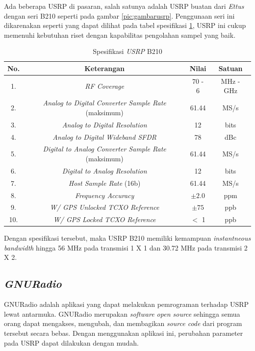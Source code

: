 Ada beberapa USRP di pasaran, salah satunya adalah USRP buatan dari \textit{Ettus} dengan seri B210 seperti pada gambar \ref{pic:gambarusrp}. Penggunaan seri ini dikarenakan seperti yang dapat dilihat pada tabel spesifikasi \ref{tab:spekb210}, USRP ini cukup memenuhi kebutuhan riset dengan kapabilitas pengolahan sampel yang baik.

\begin{longtable}{|c|c|c|c|}
	\caption{Spesifikasi \textit{USRP} B210}
	\label{tab:spekb210}\\
	\hline
	No. & Keterangan & Nilai & Satuan \\
	\hline
	1. & \textit{RF Coverage} & 70 - 6 & MHz - GHz \\
	\hline
	2. & \textit{Analog to Digital Converter Sample Rate} (maksimum) & 61.44 & MS/s \\
	\hline
	3. & \textit{Analog to Digital Resolution}  & 12 & bits	\\
	\hline
	4. &\textit{Analog to Digital Wideband SFDR} & 78 & dBc \\
	\hline
	5. & \textit{Digital to Analog Converter Sample Rate} (maksimum) & 61.44 & MS/s \\
	\hline
	6. & \textit{Digital to Analog Resolution}  & 12 & bits	\\
	\hline
	7. & \textit{Host Sample Rate} (16b) & 61.44 & MS/s \\
	\hline
	8. & \textit{Frequency Accuracy} & $\pm 2.0$ & ppm \\
	\hline
	9. &  \textit{W/ GPS Unlocked TCXO Reference} & $\pm 75$ & ppb \\
	\hline
	10. & \textit{W/ GPS Locked TCXO Reference} & $<$ 1 & ppb \\ 
	\hline
\end{longtable}

Dengan spesifikasi tersebut, maka USRP B210 memiliki kemampuan \textit{instantneous bandwidth} hingga 56 MHz pada transmisi 1 X 1 dan 30.72 MHz pada transmisi 2 X 2.

\subsection{\textit{GNURadio}}

GNURadio adalah aplikasi yang dapat melakukan pemrograman terhadap USRP lewat antarmuka. GNURadio merupakan \textit{software open source} sehingga semua orang dapat mengakses, mengubah, dan membagikan \textit{source code} dari program tersebut secara bebas. Dengan menggunakan aplikasi ini, perubahan parameter pada USRP dapat dilakukan dengan mudah.


